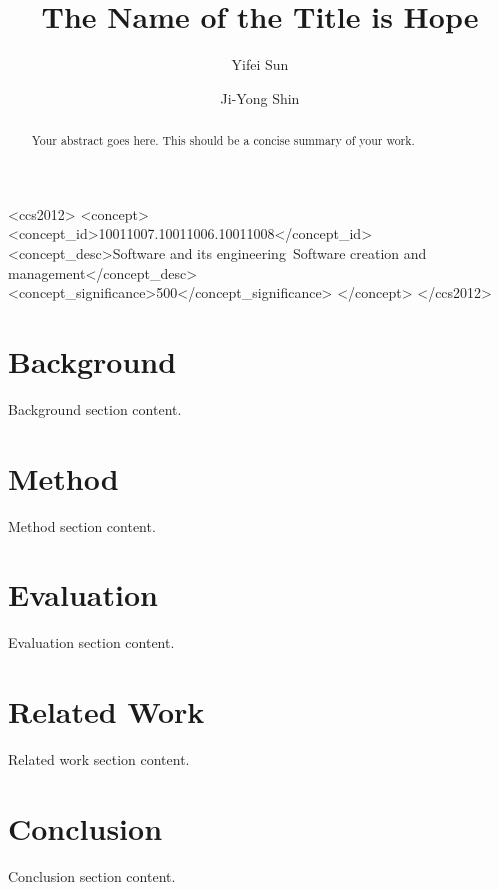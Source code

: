\documentclass[sigplan,screen,review]{acmart}
\begin{document}
\title{The Name of the Title is Hope}

\author{Yifei Sun}

\author{Ji-Yong Shin}


\renewcommand{\shortauthors}{Sun et al.}

\begin{abstract}
  Your abstract goes here. This should be a concise summary of your work.
\end{abstract}

\begin{CCSXML}
  <ccs2012>
  <concept>
  <concept_id>10011007.10011006.10011008</concept_id>
  <concept_desc>Software and its engineering~Software creation and
  management</concept_desc>
  <concept_significance>500</concept_significance>
  </concept>
  </ccs2012>
\end{CCSXML}



\maketitle






\section{Background}
Background section content.

\section{Method}
Method section content.

\section{Evaluation}
Evaluation section content.

\section{Related Work}
Related work section content.

\section{Conclusion}
Conclusion section content.



\end{document}
